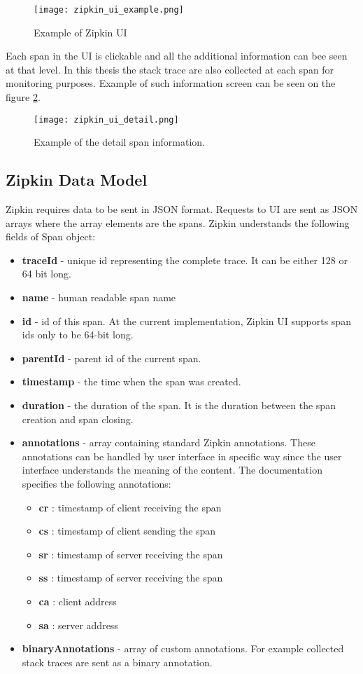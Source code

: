 \begin{figure}
	\centering
	\texttt{[image: zipkin\_ui\_example.png]}
	\caption{Example of Zipkin UI}
	\label{fig:zipkin_ui}
\end{figure}

Each span in the UI is clickable and all the additional information can bee seen at that level. In this thesis the stack trace are also collected at each span for monitoring purposes. Example of such information screen can be seen on the figure \ref{fig:zipkin_ui_detail}.
\begin{figure}
	\centering
	\texttt{[image: zipkin\_ui\_detail.png]}
	\caption{Example of the detail span information.}
	\label{fig:zipkin_ui_detail}
\end{figure}
\subsection{Zipkin Data Model}
Zipkin requires data to be sent in JSON format. Requests to UI are sent as JSON arrays where the array elements are the spans. Zipkin understands the following fields of Span object:
\begin{itemize}
	\item \textbf{traceId} - unique id representing the complete trace. It can be either 128 or 64 bit long.
	\item \textbf{name} - human readable span name
	\item \textbf{id} - id of this span. At the current implementation, Zipkin UI supports span ids only to be 64-bit long.
	\item \textbf{parentId} - parent id of the current span.
	\item \textbf{timestamp} - the time when the span was created.
	\item \textbf{duration} - the duration of the span. It is the duration between the span creation and span closing.
	\item \textbf{annotations} - array containing standard Zipkin annotations. These annotations can be handled by user interface in specific way since the user interface understands the meaning of the content. The documentation specifies the following annotations:
	\begin{itemize}
		\item \textbf{cr} : timestamp of client receiving the span
		\item \textbf{cs} : timestamp of client sending the span
		\item \textbf{sr} : timestamp of server receiving the span
		\item \textbf{ss} : timestamp of server receiving the span
		\item \textbf{ca} : client address
		\item \textbf{sa} : server address
	\end{itemize}
	\item \textbf{binaryAnnotations} - array of custom annotations. For example collected stack traces are sent as a binary annotation.
\end{itemize}

